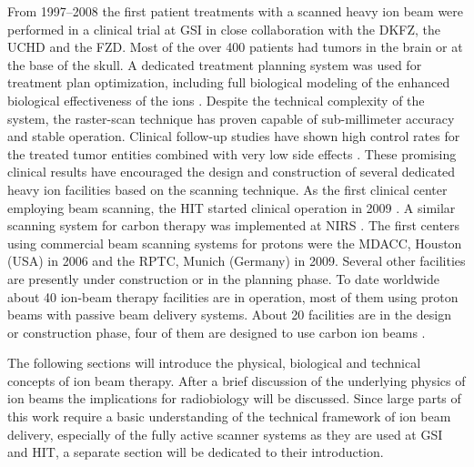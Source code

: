 From 1997--2008 the first patient treatments with a scanned heavy ion
beam were performed in a clinical trial at \ac{GSI} in close
collaboration with the \ac{DKFZ}, the \ac{UCHD} and the \ac{FZD}. Most
of the over 400 patients had tumors in the brain or at the base of the
skull. A dedicated treatment planning system was used for treatment
plan optimization, including full biological modeling of the enhanced
biological effectiveness of the \Ctw ions
\citep{Kraemer2000,Kraemer2000a}. Despite the technical complexity of
the system, the raster-scan technique has proven capable of
sub-millimeter accuracy and stable operation. Clinical follow-up
studies have shown high control rates for the treated tumor entities
combined with very low side effects \citep{Schulz-Ertner2007}. These
promising clinical results have encouraged the design and construction
of several dedicated heavy ion facilities based on the scanning
technique. As the first clinical center employing beam scanning, the
\ac{HIT} started clinical operation in 2009
\citep{Haberer2004,Combs2010}. A similar scanning system for carbon
therapy was implemented at \ac{NIRS} \citet{Furukawa2010a}. The first
centers using commercial beam scanning systems for protons were the
\ac{MDACC}, Houston (\acs{USA}) in 2006 and the \ac{RPTC}, Munich
(Germany) in 2009. Several other facilities are presently under
construction or in the planning phase. To date worldwide about 40
ion-beam therapy facilities are in operation, most of them using
proton beams with passive beam delivery systems. About 20 facilities
are in the design or construction phase, four of them are designed to
use carbon ion beams \citep{PTCOG2011}.

The following sections will introduce the physical, biological and
technical concepts of ion beam therapy. After a brief discussion of
the underlying physics of ion beams the implications for radiobiology
will be discussed. Since large parts of this work require a basic
understanding of the technical framework of ion beam delivery,
especially of the fully active scanner systems as they are used at
\ac{GSI} and \ac{HIT}, a separate section will be dedicated to their
introduction.




